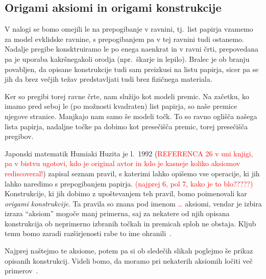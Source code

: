 \subsection{Origami aksiomi in origami konstrukcije}

V nalogi se bomo omejili le na prepogibanje v ravnini, tj.\ list papirja vzamemo za model evklidske ravnine, s prepogibanjem pa v tej ravnini tudi ostanemo. Nadalje pregibe konsktruiramo le po enega naenkrat in v ravni črti, prepovedana pa je uporaba kakršnegakoli orodja (npr.\ škarje in lepilo).  Bralec je ob branju povabljen, da opisane konstrukcije tudi sam preizkusi na listu papirja, sicer pa se jih da brez večjih težav predstavljati tudi brez fizičnega materiala.

Ker so pregibi torej ravne črte, nam služijo kot modeli premic. Na začetku, ko imamo pred seboj le (po možnosti kvadraten) list papirja, so naše premice njegove stranice. Manjkajo nam samo še modeli točk. To so ravno oglišča našega lista papirja, nadaljne točke pa dobimo kot presečišča premic, torej presečišča pregibov.

Japonski matematik Humiaki Huzita je l.\ 1992 (\textcolor{red}{REFERENCA 26 v uni knjigi, pa v bistvu ugotovi, kdo je original avtor in kdo je kasneje koliko aksiomov rediscoveral!}) zapisal seznam pravil, s katerimi lahko opišemo vse operacije, ki jih lahko naredimo s prepogibanjem papirja. \textcolor{red}{(najprej 6, pol 7, kako je to blo?????)} Konstrukcije, ki jih dobimo z upoštevanjem teh pravil, bomo poimenovali kar \emph{origami konstrukcije}. Ta pravila so znana pod imenom \textcolor{red}{\ldots} aksiomi, vendar je izbira izraza ``aksiom'' mogoče manj primerna, saj za nekatere od njih opisana konstrukcija ob neprimerno izbranih točkah in premicah sploh ne obstaja. Kljub temu bomo zaradi razširjenosti rabe to ime ohranili~\cite[str.\ 7]{zore2022}.

Najprej naštejmo te aksiome, potem pa si ob sledečih slikah poglejmo še prikaz opisanih konstrukcij. Videli bomo, da moramo pri nekaterih aksiomih ločiti več primerov~\cite{michael2005, zore2022}.

\renewcommand{\theaksiom}{O\arabic{aksiom}}

